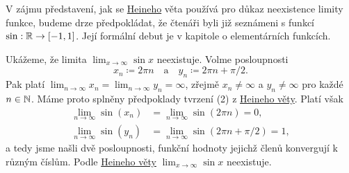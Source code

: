 \begin{example}{}{}
 V zájmu představení, jak se \hyperref[thm:heineho]{Heineho} věta používá pro
 důkaz neexistence limity funkce, budeme drze předpokládat, že čtenáři byli již
 seznámeni s funkcí $\sin:\mathbb{R} \to [-1,1]$. Její formální debut je v kapitole o
 elementárních funkcích. %

 Ukážeme, že limita $\lim_{x \to \infty} \sin x$ neexistuje. Volme posloupnosti
 \[
  x_n \coloneqq 2\pi n \quad \text{a} \quad y_n \coloneqq 2\pi n + \pi / 2.
 \]
 Pak platí $\lim_{n \to \infty} x_n = \lim_{n \to \infty} y_n = \infty$, zřejmě
 $x_n \neq \infty$ a $y_n \neq \infty$ pro každé $n \in \mathbb{N}$. Máme proto splněny
 předpoklady tvrzení (2) z \hyperref[thm:heineho]{Heineho věty}. Platí však
 \begin{align*}
  \lim_{n \to \infty} \sin(x_n) &= \lim_{n \to \infty} \sin(2\pi n) = 0,\\
  \lim_{n \to \infty} \sin(y_n) &= \lim_{n \to \infty} \sin(2\pi n + \pi / 2) =
  1,
 \end{align*}
 a tedy jsme našli dvě posloupnosti, funkční hodnoty jejichž členů konvergují k
 různým číslům. Podle \hyperref[thm:heineho]{Heineho věty} $\lim_{x \to \infty}
 \sin x$ neexistuje.
\end{example}


